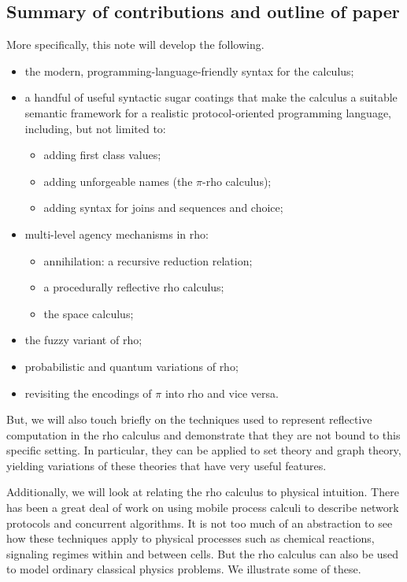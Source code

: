 \subsection{Summary of contributions and outline of paper}
More specifically, this note will develop the following.
\begin{itemize}
  \item the modern, programming-language-friendly syntax for the calculus;
  \item a handful of useful syntactic sugar coatings that make the
    calculus a suitable semantic framework for a realistic
    protocol-oriented programming language, including, but not limited
    to:
    \begin{itemize}
      \item adding first class values;
      \item adding unforgeable names (the $\pi$-rho calculus);
      \item adding syntax for joins and sequences and choice;
    \end{itemize}
  \item multi-level agency mechanisms in rho:
    \begin{itemize}
        \item annihilation: a recursive reduction relation;
        \item a procedurally reflective rho calculus;
        \item the space calculus;
    \end{itemize}
  \item the fuzzy variant of rho;
  \item probabilistic and quantum variations of rho;
  \item revisiting the encodings of $\pi$ into rho and vice versa.
\end{itemize}

But, we will also touch briefly on the techniques used to represent
reflective computation in the rho calculus and demonstrate that they
are not bound to this specific setting. In particular, they can be
applied to set theory and graph theory, yielding variations of these
theories that have very useful features.

Additionally, we will look at relating the rho calculus to physical
intuition. There has been a great deal of work on using mobile process
calculi to describe network protocols and concurrent algorithms. It is
not too much of an abstraction to see how these techniques apply to
physical processes such as chemical reactions, signaling regimes
within and between cells. But the rho calculus can also be used to
model ordinary classical physics problems. We illustrate some of
these.

